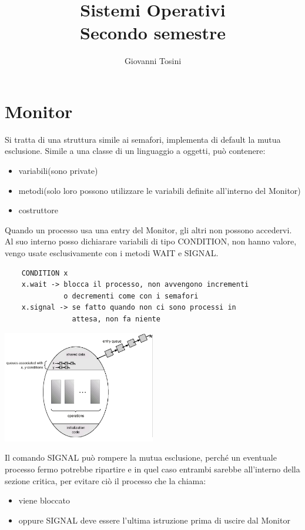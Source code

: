 \documentclass[a4paper, 12pt]{book}
\begin{document}
    
\author{Giovanni Tosini}
\title{Sistemi Operativi \\
\large Secondo semestre}
\date{ }
\maketitle
\newpage
\tableofcontents
\newpage

\chapter{Monitor}

Si tratta di una struttura simile ai semafori, implementa di default la mutua esclusione. Simile a una classe di un linguaggio a oggetti, può contenere:
\begin{itemize}
    \item variabili(sono private)
    \item metodi(solo loro possono utilizzare le variabili definite all'interno del Monitor)
    \item costruttore
\end{itemize}

Quando un processo usa una entry del Monitor, gli altri non possono accedervi. Al suo interno posso dichiarare variabili di tipo CONDITION, non hanno valore, vengo usate esclusivamente con i metodi WAIT e SIGNAL.

\begin{verbatim}
    CONDITION x
    x.wait -> blocca il processo, non avvengono incrementi
              o decrementi come con i semafori
    x.signal -> se fatto quando non ci sono processi in
                attesa, non fa niente
\end{verbatim}

\begin{center}
    \includegraphics[width=0.5\textwidth]{ovetto.png}
\end{center}

Il comando SIGNAL può rompere la mutua esclusione, perché un eventuale processo fermo potrebbe ripartire e in quel caso entrambi sarebbe all'interno della sezione critica, per evitare ciò il processo che la chiama:
\begin{itemize}
    \item viene bloccato
    \item oppure SIGNAL deve essere l'ultima istruzione prima di uscire dal Monitor
\end{itemize}
\end{document}
